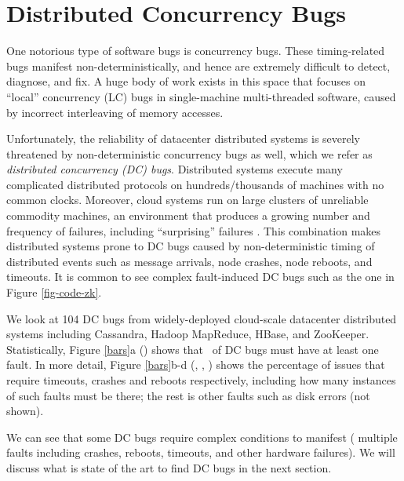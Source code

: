 \section{Distributed Concurrency Bugs}

One notorious type of software bugs is concurrency bugs. These timing-related
bugs manifest non-deterministically, and hence are extremely difficult to
detect, diagnose, and fix. A huge body of work exists in this space that
focuses on ``local'' concurrency (LC) bugs in single-machine multi-threaded
software, caused by incorrect interleaving of memory accesses.

Unfortunately, the reliability of datacenter distributed systems is severely
threatened by non-deterministic concurrency bugs as well, which we refer as
{\em distributed concurrency (DC) bugs}.  
% 
Distributed systems execute many complicated distributed protocols on
hundreds/thousands of machines with no common clocks. Moreover, cloud systems
run on large clusters of unreliable commodity machines, an environment that
produces a growing number and frequency of failures, including ``surprising''
failures \cite{Birman+09-CloudAgenda, Henry09-AmazonFUD}.  This combination
makes distributed systems prone to DC bugs caused by non-deterministic timing
of distributed events such as message arrivals, node crashes, node reboots, and
timeouts. It is common to see complex fault-induced DC bugs such as the one
in Figure \ref{fig-code-zk}.




We look at 104 DC bugs from widely-deployed cloud-scale datacenter distributed
systems including Cassandra, Hadoop MapReduce, HBase, and ZooKeeper.
Statistically, Figure \ref{bars}a (\BFLT) shows that \pctFaultYes\ of DC bugs
must have at least one fault. In more detail, Figure \ref{bars}b-d (\BTO, \BCR,
\BRB) shows the percentage of issues that require timeouts, crashes and reboots
respectively, including how many instances of such faults must be there; the
rest is other faults such as disk errors (not shown).



We can see that some DC bugs require complex conditions to manifest (\ie
multiple faults including crashes, reboots, timeouts, and other hardware
failures). We will discuss what is state of the art to find DC bugs in the next
section.
\fi

